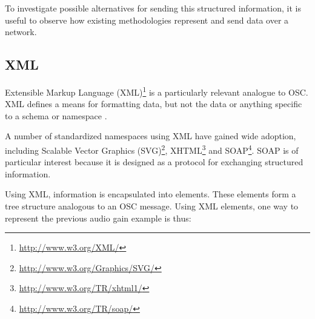 \documentclass{NIME-alternate}
\begin{document}
To investigate possible alternatives for sending this structured information, it is useful to observe how existing methodologies  represent and send data over a network.

%
%
%



\subsection{XML} %
\label{sub:xml}

Extensible Markup Language (XML)\footnote{\url{http://www.w3.org/XML/}} is a particularly relevant analogue to OSC.  XML defines a means for formatting data, but not the data or anything specific to a schema or namespace \cite{xml:2006}. 

A number of standardized namespaces using XML have gained wide adoption, including Scalable Vector Graphics (SVG)\footnote{\url{http://www.w3.org/Graphics/SVG/}}, XHTML\footnote{\url{http://www.w3.org/TR/xhtml1/}} and SOAP\footnote{\url{http://www.w3.org/TR/soap/}}.  SOAP is of particular interest because it is designed as a protocol for exchanging structured information.

Using XML, information is encapsulated into elements. These elements form a tree structure analogous to an OSC message. Using XML elements, one way to represent the previous audio gain example is thus:
\end{document}
